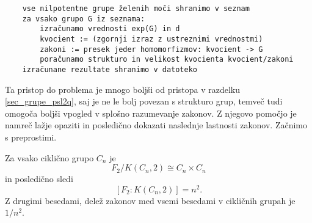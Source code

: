 \begin{verbatim}
    vse nilpotentne grupe želenih moči shranimo v seznam 
    za vsako grupo G iz seznama:
        izračunamo vrednosti exp(G) in d
        kvocient := (zgornji izraz z ustreznimi vrednostmi)
        zakoni := presek jeder homomorfizmov: kvocient -> G
        poračunamo strukturo in velikost kvocienta kvocient/zakoni
    izračunane rezultate shranimo v datoteko
\end{verbatim}
Ta pristop do problema je mnogo boljši od pristopa v razdelku \ref{sec_grupe_psl2q}, saj je ne le bolj povezan s strukturo grup, temveč tudi omogoča boljši vpogled v splošno razumevanje zakonov.
Z njegovo pomočjo je namreč lažje opaziti in posledično dokazati naslednje lastnosti zakonov. Začnimo s preprostimi.
\begin{trditev}
\label{trd_lastnosti_zakonov_ciklicne}
 Za vsako ciklično grupo $C_n$ je \begin{equation*}
 F_2 / K(C_n, 2) \cong C_n \times C_n
 \end{equation*}  
 in posledično sledi \begin{equation*}
\left[ F_2 : K(C_n, 2) \right] = n^2.
 \end{equation*}  
Z drugimi besedami, delež zakonov med vsemi besedami v cikličnih grupah je $1 / n^2$.
\end{trditev}

